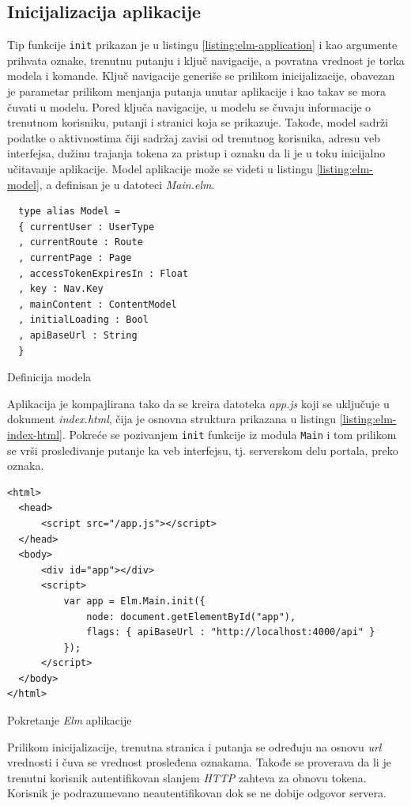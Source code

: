 \documentclass[12pt,oneside]{memoir}
\begin{document}
\subsection{Inicijalizacija aplikacije}
Tip funkcije \texttt{init} prikazan je u listingu \ref{listing:elm-application} i kao argumente prihvata oznake, trenutnu putanju i ključ navigacije,
a povratna vrednost je torka modela i komande. Ključ navigacije generiše se prilikom inicijalizacije, obavezan je parametar prilikom menjanja
putanja unutar aplikacije i kao takav se mora čuvati u modelu. Pored ključa navigacije, u modelu se čuvaju informacije o trenutnom korisniku,
putanji i stranici koja se prikazuje. Takođe, model sadrži podatke o aktivnostima čiji sadržaj zavisi od trenutnog korisnika, adresu veb interfejsa,
dužinu trajanja tokena za pristup i oznaku da li je u toku inicijalno učitavanje aplikacije. Model aplikacije može se videti u listingu \ref{listing:elm-model},
a definisan je u datoteci \emph{Main.elm}.
\begin{listing}[h]
\begin{verbatim}
  type alias Model =
  { currentUser : UserType
  , currentRoute : Route
  , currentPage : Page
  , accessTokenExpiresIn : Float
  , key : Nav.Key
  , mainContent : ContentModel
  , initialLoading : Bool
  , apiBaseUrl : String
  }
\end{verbatim}
\caption{Definicija modela}
\label{listing:elm-model}
\end{listing}

Aplikacija je kompajlirana tako da se kreira datoteka \emph{app.js} koji se uključuje u dokument \emph{index.html},
čija je osnovna struktura prikazana u listingu \ref{listing:elm-index-html}. Pokreće se pozivanjem \texttt{init}
funkcije iz modula \texttt{Main} i tom prilikom se vrši prosleđivanje putanje ka veb interfejsu, tj. serverskom delu portala,
preko oznaka.
\begin{listing}[h]
\begin{verbatim}
<html>
  <head>
      <script src="/app.js"></script>
  </head>
  <body>
      <div id="app"></div>
      <script>
          var app = Elm.Main.init({
              node: document.getElementById("app"),
              flags: { apiBaseUrl : "http://localhost:4000/api" }
          });
      </script>
  </body>
</html>
\end{verbatim}
\caption{Pokretanje \emph{Elm} aplikacije}
\label{listing:elm-index-html}
\end{listing}
Prilikom inicijalizacije, trenutna stranica i putanja se određuju na osnovu \emph{url} vrednosti i
čuva se vrednost prosleđena oznakama. Takođe se proverava da li je trenutni korisnik autentifikovan
slanjem \emph{HTTP} zahteva za obnovu tokena. Korisnik je podrazumevano neautentifikovan dok se ne dobije
odgovor servera. 
\end{document}
